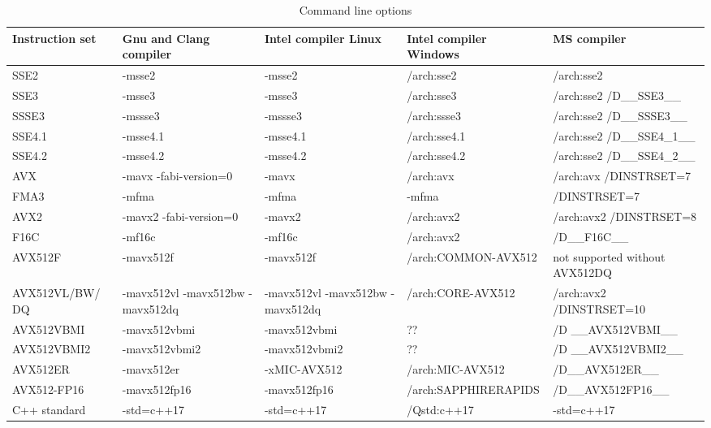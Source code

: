\documentclass[vcl_manual.tex]{subfiles}
\begin{document}
\begin {table}[h]
\caption{Command line options}
\label{table:CommandLineOptions}
\begin{tabular}{|p{26mm}|p{28mm}|p{28mm}|p{28mm}|p{28mm}|}
\hline
\bfseries Instruction set & \bfseries Gnu and Clang compiler & \bfseries Intel compiler Linux & \bfseries Intel compiler Windows & \bfseries MS compiler \\ \hline

SSE2 & -msse2 & -msse2 & /arch:sse2 & /arch:sse2 \\ \hline
SSE3 & -msse3 & -msse3 & /arch:sse3 & /arch:sse2 \newline /D\_\_SSE3\_\_ \\ \hline
SSSE3 & -mssse3 & -mssse3 & /arch:ssse3 & /arch:sse2 \newline /D\_\_SSSE3\_\_ \\ \hline
SSE4.1 & -msse4.1 & -msse4.1 & /arch:sse4.1 & /arch:sse2 \newline /D\_\_SSE4\_1\_\_ \\ \hline
SSE4.2 & -msse4.2 & -msse4.2 & /arch:sse4.2 & /arch:sse2 \newline /D\_\_SSE4\_2\_\_ \\ \hline
AVX & -mavx \newline -fabi-version=0 & -mavx & /arch:avx & /arch:avx /DINSTRSET=7 \\ \hline
FMA3 & -mfma & -mfma & -mfma & /DINSTRSET=7 \\ \hline
AVX2 & -mavx2 \newline -fabi-version=0 & -mavx2 & /arch:avx2 & /arch:avx2 \newline /DINSTRSET=8 \\ \hline
F16C & -mf16c & -mf16c & /arch:avx2 & /D\_\_F16C\_\_ \\ \hline
AVX512F & -mavx512f & -mavx512f & /arch:COMMON-AVX512 & not supported without AVX512DQ\\ \hline
AVX512VL/BW/ DQ & -mavx512vl -mavx512bw -mavx512dq & -mavx512vl -mavx512bw -mavx512dq & /arch:CORE-AVX512 & /arch:avx2 /DINSTRSET=10 \\ \hline
AVX512VBMI & -mavx512vbmi & -mavx512vbmi & ?? & /D \_\_AVX512VBMI\_\_ \\ \hline
AVX512VBMI2 & -mavx512vbmi2 & -mavx512vbmi2 & ?? & /D \_\_AVX512VBMI2\_\_ \\ \hline
AVX512ER & -mavx512er & -xMIC-AVX512 & /arch:MIC-AVX512 & /D\_\_AVX512ER\_\_ \\ \hline
AVX512-FP16 & -mavx512fp16 & -mavx512fp16 & /arch:SAPPHIRERAPIDS & /D\_\_AVX512FP16\_\_ \\ \hline
C++ standard & -std=c++17 & -std=c++17 & /Qstd:c++17 & -std=c++17 \\ \hline
\end{tabular}
\end{table}
\end{document}
